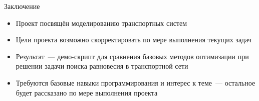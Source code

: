 \documentclass[12pt]{beamer}
\begin{document}
\begin{frame}{Заключение}
\begin{itemize}
\item Проект посвящён моделированию транспортных систем
\item Цели проекта возможно скорректировать по мере выполнения текущих задач
\item Результат~--- демо-скрипт для сравнения базовых методов оптимизации при решении задачи поиска равновесия в транспортной сети
\item Требуются базовые навыки программирования и интерес к теме~--- остальное будет рассказано по мере выполнения проекта
\end{itemize}
\end{frame}
\end{document}
